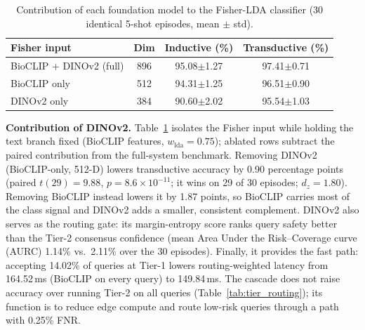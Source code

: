 \begin{table}[htbp]
\caption{Contribution of each foundation model to the Fisher-LDA classifier (30 identical 5-shot episodes, mean $\pm$ std).}
\label{tab:feature_ablation}
\centering

\footnotesize
\setlength{\tabcolsep}{4pt}
\begin{tabular*}{\columnwidth}{@{\extracolsep{\fill}}lccc}
\toprule
\textbf{Fisher input} & \textbf{Dim} & \textbf{Inductive (\%)} & \textbf{Transductive (\%)} \\
\midrule
BioCLIP + DINOv2 (full) & 896 & 95.08$\pm$1.27 & 97.41$\pm$0.71 \\
BioCLIP only & 512 & 94.31$\pm$1.25 & 96.51$\pm$0.90 \\
DINOv2 only & 384 & 90.60$\pm$2.02 & 95.54$\pm$1.03 \\
\bottomrule
\end{tabular*}
\end{table}

\textbf{Contribution of DINOv2.} Table~\ref{tab:feature_ablation} isolates the Fisher input while holding the text branch fixed (BioCLIP features, $w_{\mathrm{lda}}=0.75$); ablated rows subtract the paired contribution from the full-system benchmark. Removing DINOv2 (BioCLIP-only, 512-D) lowers transductive accuracy by 0.90 percentage points (paired $t(29)=9.88$, $p=8.6\times10^{-11}$; it wins on 29 of 30 episodes; $d_z=1.80$). Removing BioCLIP instead lowers it by 1.87 points, so BioCLIP carries most of the class signal and DINOv2 adds a smaller, consistent complement. DINOv2 also serves as the routing gate: its margin-entropy score ranks query safety better than the Tier-2 consensus confidence (mean Area Under the Risk--Coverage curve (AURC) 1.14\% vs.\ 2.11\% over the 30 episodes). Finally, it provides the fast path: accepting 14.02\% of queries at Tier-1 lowers routing-weighted latency from 164.52\,ms (BioCLIP on every query) to 149.84\,ms. The cascade does not raise accuracy over running Tier-2 on all queries (Table~\ref{tab:tier_routing}); its function is to reduce edge compute and route low-risk queries through a path with 0.25\% FNR.


